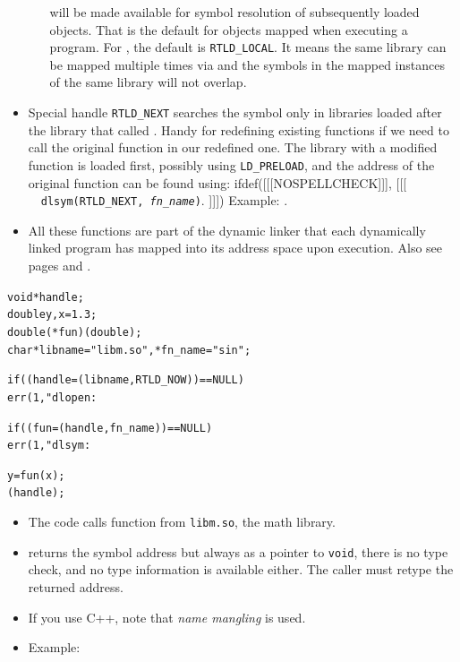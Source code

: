 \begin{itemize}
\begin{itemize}
    will be  made available for symbol resolution of subsequently loaded
    objects.  That is the default for objects mapped when executing a program.
    For , the default is \texttt{RTLD\_LOCAL}.  It means
    the same library can be mapped multiple times via  and the
    symbols in the mapped instances of the same library will not overlap.
    \end{itemize}
\item \label{RTLD_NEXT} Special handle \texttt{RTLD\_NEXT} searches the symbol
only in libraries loaded after the library that called .  Handy for
redefining existing functions if we need to call the original function in our
redefined one.  The library with a modified function is loaded first, possibly
using \texttt{LD\_PRELOAD}, and the address of the original function can be
found using:
ifdef([[[NOSPELLCHECK]]], [[[
~~\texttt{dlsym(RTLD\_NEXT, \emph{fn\_name})}.
]]])
Example: .
\item  All these functions are part of the dynamic linker that each dynamically
linked program has mapped into its address space upon execution.  Also see pages
\pageref{RUNTIMELINKER} and \pageref{EXEC}.
\end{itemize}


\begin{slide}
\begin{alltt}
void *handle;
double y, x = 1.3;
double (*fun)(double); 
char *libname = "libm.so", *fn\_name = "sin";

if ((handle = (libname, RTLD\_NOW)) == NULL)
        err(1, "dlopen: %

if ((fun = (handle, fn\_name)) == NULL)
        err(1, "dlsym: %

y = fun(x);
(handle);
\end{alltt}
\end{slide}

\begin{itemize}
\item The code calls function  from \texttt{libm.so}, the math
library.
\item {} returns the symbol address but always as a pointer to
\texttt{void}, there is no type check, and no type information is available
either.  The caller must retype the returned address.
\item If you use C++, note that \emph{name mangling} is used.
\item Example: 
\end{itemize}

\endinput
